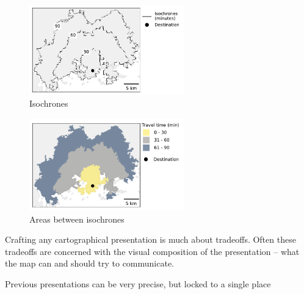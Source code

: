 

\begin{figure}[H]
	\centering
	\includegraphics[width=0.6\textwidth]{visual/figures/ttm/isochrone_lines.pdf}
	\caption{Isochrones}
	\label{fig:isochrone lines}
\end{figure}

\begin{figure}[H]
	\centering
	\includegraphics[width=0.6\textwidth]{visual/figures/ttm/isochrone_areas.pdf}
	\caption{Areas between isochrones}
	\label{fig:isochrone areas}
\end{figure}

Crafting any cartographical presentation is much about tradeoffs.
Often these tradeoffs are concerned with the visual composition of the presentation --
what the map can and should try to communicate.

Previous presentations can be very precise, but locked to a single place

